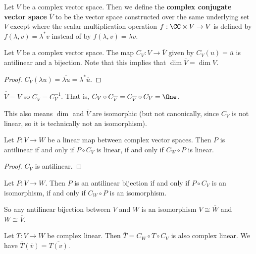 \begin{defn}
Let $V$ be a complex vector space. Then we define the \textbf{complex conjugate vector space} $\overline{V}$ to be the vector space constructed over the same underlying set $V$ except where the scalar multiplication operation $f : \CC\times V\to V$ is defined by $f(\lambda,v) = \lambda^* v$ instead of by $f(\lambda,v)=\lambda v$.
\end{defn}

\begin{lemma}
    Let $V$ be a complex vector space. The map $C_V : V\to \overline{V}$ given by $C_V(u) = \overline{u}$ is antilinear and a bijection. Note that this implies that $\dim \overline{V} = \dim V$.
\end{lemma}
\begin{proof}
$C_V(\lambda u) = \overline{\lambda u} = \lambda^* \overline{u}$.
\end{proof}

\begin{remark*}
$\overline{\overline{V}}=V$ so $C_{\overline{V}} = C_V^{-1}$.  That is, $C_V\circ C_{\overline{V}} =C_{\overline{V}}\circ C_V= \One$.
\end{remark*}
\begin{remark*}
    This also means $\dim $ and $\overline{V}$ are isomorphic (but not canonically, since $C_V$ is not linear, so it is technically not an isomorphism). 
\end{remark*}
\begin{lemma}
    Let $P : V \to W$ be a linear map between complex vector spaces.  Then $P$ is antilinear if and only if $P\circ C_V$ is linear, if and only if $C_W\circ P$ is linear.
\end{lemma}
\begin{proof}
    $C_V$ is antilinear.
\end{proof}

\begin{cor}Let $P : V \to W$. Then $P$ is an antilinear bijection if and only if $P\circ C_V$ is an isomorphism, if and only if $C_W\circ P$ is an isomorphism.
\end{cor}

So any antilinear bijection between $V$ and $W$ is an isomorphism $V\cong \overline{W}$ and $W\cong\overline{V}$.

\begin{cor}
    Let $T : V \to W$ be complex linear. Then $\overline{T} = C_W\circ T\circ C_V$ is also complex linear. We have $\overline{T}(\overline{v}) = \overline{T(v)}$.
\end{cor}

